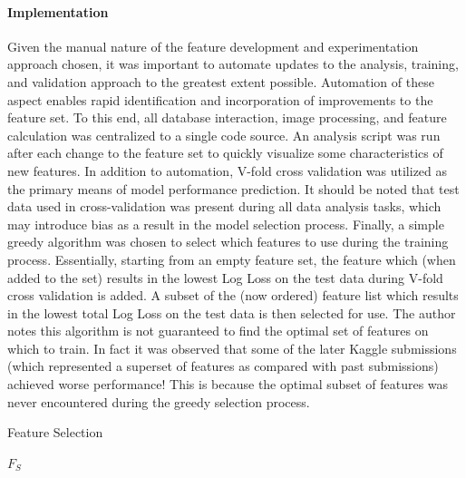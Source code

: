 \documentclass[fleqn,10pt]{SelfArx} %
\begin{document}
\paragraph{Implementation} Given the manual nature of the feature development and experimentation approach chosen, it was important to automate updates to the analysis, training, and validation approach to the greatest extent possible.  Automation of these aspect enables rapid identification and incorporation of improvements to the feature set.  To this end, all database interaction, image processing, and feature calculation was centralized to a single code source.  An analysis script was run after each change to the feature set to quickly visualize some characteristics of new features.  In addition to automation, V-fold cross validation was utilized as the primary means of model performance prediction.  It should be noted that test data used in cross-validation was present during all data analysis tasks, which may introduce bias as a result in the model selection process. \cite{cawley}  Finally, a simple greedy algorithm was chosen to select which features to use during the training process.  Essentially, starting from an empty feature set, the feature which (when added to the set) results in the lowest Log Loss on the test data during V-fold cross validation is added.  A subset of the (now ordered) feature list which results in the lowest total Log Loss on the test data is then selected for use.  The author notes this algorithm is not guaranteed to find the optimal set of features on which to train.  In fact it was observed that some of the later Kaggle submissions (which represented a superset of features as compared with past submissions) achieved worse performance!  This is because the optimal subset of features was never encountered during the greedy selection process.

\begin{algorithm}
	\caption{Feature Selection}
	\label{alg:3}
	\begin{algorithmic}[1]
		\ENDIF
		\ENDIF
		\ENDFOR
		\ENDWHILE
		\RETURN $F_S$
	\end{algorithmic}
\end{algorithm}
\end{document}
